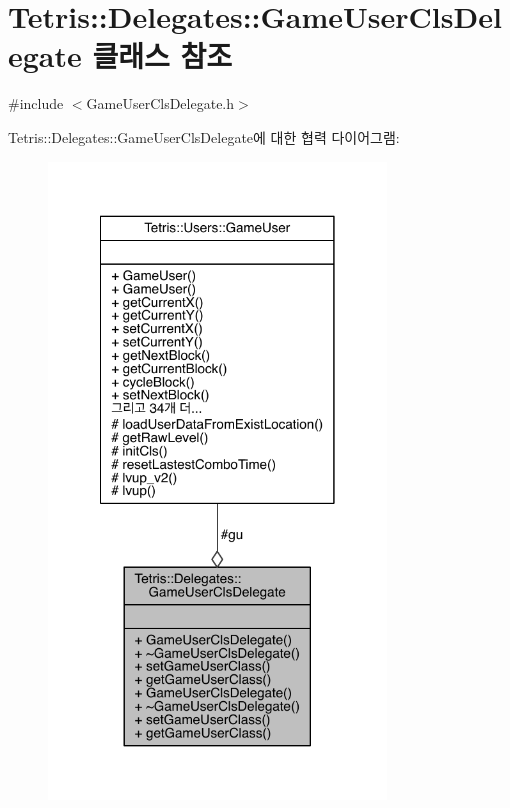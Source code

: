 \hypertarget{class_tetris_1_1_delegates_1_1_game_user_cls_delegate}{}\section{Tetris\+:\+:Delegates\+:\+:Game\+User\+Cls\+Delegate 클래스 참조}
\label{class_tetris_1_1_delegates_1_1_game_user_cls_delegate}


{\ttfamily \#include $<$Game\+User\+Cls\+Delegate.\+h$>$}



Tetris\+:\+:Delegates\+:\+:Game\+User\+Cls\+Delegate에 대한 협력 다이어그램\+:
\nopagebreak
\begin{figure}[H]
\begin{center}
\leavevmode
\includegraphics[width=254pt]{class_tetris_1_1_delegates_1_1_game_user_cls_delegate__coll__graph}
\end{center}
\end{figure}
